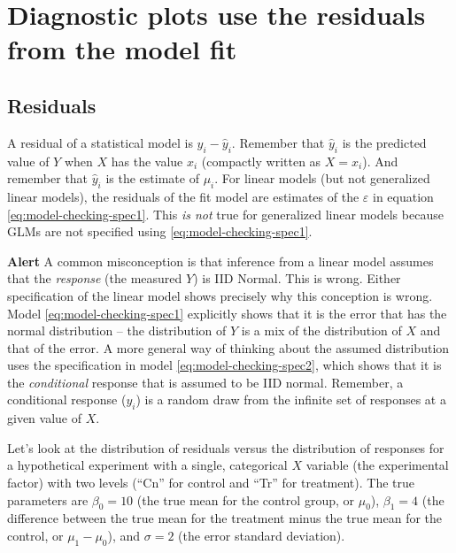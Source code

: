 \documentclass[]{book}
\begin{document}
\hypertarget{diagnostic-plots-use-the-residuals-from-the-model-fit}{%
\section{Diagnostic plots use the residuals from the model fit}\label{diagnostic-plots-use-the-residuals-from-the-model-fit}}

\hypertarget{residuals}{%
\subsection{Residuals}\label{residuals}}

A residual of a statistical model is \(y_i - \hat{y}_i\). Remember that \(\hat{y}_i\) is the predicted value of \(Y\) when \(X\) has the value \(x_i\) (compactly written as \(X=x_i\)). And remember that \(\hat{y}_i\) is the estimate of \(\mu_i\). For linear models (but not generalized linear models), the residuals of the fit model are estimates of the \(\varepsilon\) in equation \eqref{eq:model-checking-spec1}. This \emph{is not} true for generalized linear models because GLMs are not specified using \eqref{eq:model-checking-spec1}.

\textbf{Alert} A common misconception is that inference from a linear model assumes that the \emph{response} (the measured \(Y\)) is IID Normal. This is wrong. Either specification of the linear model shows precisely why this conception is wrong. Model \eqref{eq:model-checking-spec1} explicitly shows that it is the error that has the normal distribution -- the distribution of \(Y\) is a mix of the distribution of \(X\) and that of the error. A more general way of thinking about the assumed distribution uses the specification in model \eqref{eq:model-checking-spec2}, which shows that it is the \emph{conditional} response that is assumed to be IID normal. Remember, a conditional response (\(y_i\)) is a random draw from the infinite set of responses at a given value of \(X\).

Let's look at the distribution of residuals versus the distribution of responses for a hypothetical experiment with a single, categorical \(X\) variable (the experimental factor) with two levels (``Cn'' for control and ``Tr'' for treatment). The true parameters are \(\beta_0 = 10\) (the true mean for the control group, or \(\mu_{0}\)), \(\beta_1=4\) (the difference between the true mean for the treatment minus the true mean for the control, or \(\mu_1 - \mu_0\)), and \(\sigma = 2\) (the error standard deviation).
\end{document}

